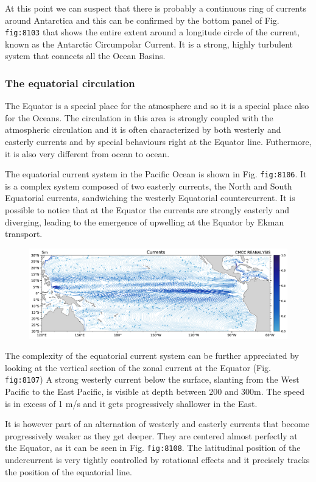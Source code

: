 At this point we can suspect that there is probably a continuous ring of
currents around Antarctica and this can be confirmed by the bottom panel
of Fig. \texttt{fig:8103} that shows the entire extent around a
longitude circle of the current, known as the Antarctic Circumpolar
Current. It is a strong, highly turbulent system that connects all the
Ocean Basins.

\subsubsection{The equatorial
circulation}\label{the-equatorial-circulation}

The Equator is a special place for the atmosphere and so it is a special
place also for the Oceans. The circulation in this area is strongly
coupled with the atmospheric circulation and it is often characterized
by both westerly and easterly currents and by special behaviours right
at the Equator line. Futhermore, it is also very different from ocean to
ocean.

The equatorial current system in the Pacific Ocean is shown in Fig.
\texttt{fig:8106}. It is a complex system composed of two easterly
currents, the North and South Equatorial currents, sandwiching the
westerly Equatorial countercurrent. It is possible to notice that at the
Equator the currents are strongly easterly and diverging, leading to the
emergence of upwelling at the Equator by Ekman transport.

\begin{figure}
\centering
\includegraphics[width = .7 \textwidth]{figs/GD/UVstream5mPac.png}
\caption{} \label{fig:}
\end{figure}

The complexity of the equatorial current system can be further
appreciated by looking at the vertical section of the zonal current at
the Equator (Fig. \texttt{fig:8107}) A strong westerly current below the
surface, slanting from the West Pacific to the East Pacific, is visible
at depth between 200 and 300m. The speed is in excess of 1 m/s and it
gets progressively shallower in the East.

It is however part of an alternation of westerly and easterly currents
that become progressively weaker as they get deeper. They are centered
almost perfectly at the Equator, as it can be seen in Fig.
\texttt{fig:8108}. The latitudinal position of the undercurrent is very
tightly controlled by rotational effects and it precisely tracks the
position of the equatorial line.

